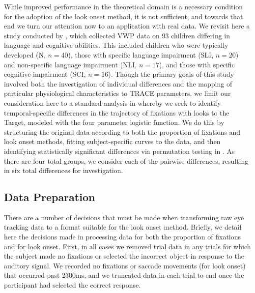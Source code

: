 While improved performance in the theoretical domain is a necessary condition for the adoption of the look onset method, it is not sufficient, and towards that end we turn our attention now to an application with real data. We revisit here a study conducted by \cite{mcmurray2010individual}, which collected VWP data on 93 children differing in language and cognitive abilities. This included children who were typically developed (N, $n = 40$), those with specific language impairment (SLI, $n = 20$) and non-specific language impairment (NLI, $n = 17$), and those with specific cognitive impairment (SCI, $n = 16$). Though the primary goals of this study involved both the investigation of individual differences and the mapping of particular physiological characteristics to TRACE parameters, we limit our consideration here to a standard analysis in  whereby we seek to identify temporal-specific differences in the trajectory of fixations with looks to the Target, modeled with the four parameter logistic function. We do this by structuring the original data according to both the proportion of fixations and look onset methods, fitting subject-specific curves to the data, and then identifying statistically significant differences via permutation testing in . As there are four total groups, we consider each of the pairwise differences, resulting in six total differences for investigation.

\subsection{Data Preparation}

There are a number of decisions that must be made when transforming raw eye tracking data to a format suitable for the look onset method. Briefly, we detail here the decisions made in processing data for both the proportion of fixations and for look onset. First, in all cases we removed trial data in any trials for which the subject made no fixations or selected the incorrect object in response to the auditory signal. We recorded no fixations or saccade movements (for look onset) that occurred past 2300ms, and we truncated data in each trial to end once the participant had selected the correct response.


